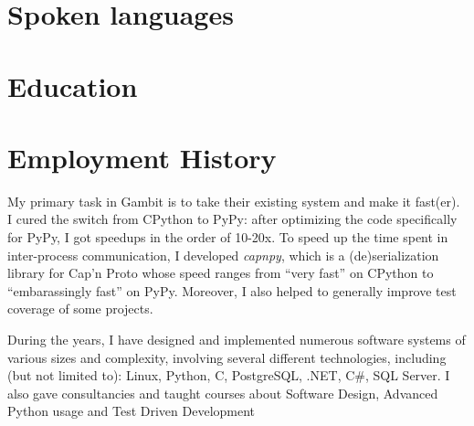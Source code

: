 \documentclass[11pt,a4paper]{moderncv}
\begin{document}
\section{Spoken languages}

\section{Education}
\cvitem{}{}

\cvitem{}{}

\cvitem{}{}

\cvitem{}{}

\section{Employment History}
 {My primary task in
  Gambit is to take their existing system and make it fast(er).  I cured the
  switch from CPython to PyPy: after optimizing the code specifically for
  PyPy, I got speedups in the order of 10-20x.  To speed up the time spent in
  inter-process communication, I developed \emph{capnpy}, which is a
  (de)serialization library for Cap'n Proto whose speed ranges from ``very
  fast'' on CPython to ``embarassingly fast'' on PyPy.  Moreover, I also
  helped to generally improve test coverage of some projects.}

 {During the years, I have designed and implemented numerous
  software systems of various sizes and complexity, involving several
  different technologies, including (but not limited to): Linux, Python, C,
  PostgreSQL, .NET, C\#, SQL Server.  I also gave consultancies and taught
  courses about Software Design, Advanced Python usage and Test Driven
  Development}
\cvitem{}{}
\end{document}
